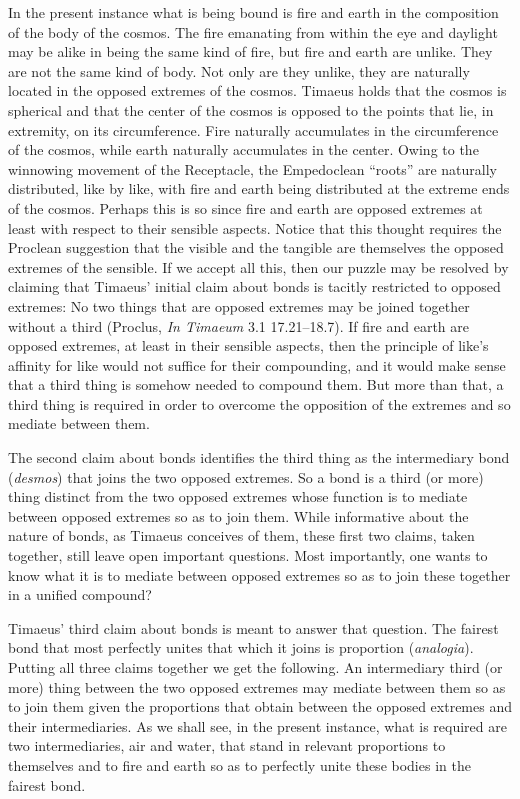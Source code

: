 In the present instance what is being bound is fire and earth in the composition of the body of the cosmos. The fire emanating from within the eye and daylight may be alike in being the same kind of fire, but fire and earth are unlike. They are not the same kind of body. Not only are they unlike, they are naturally located in the opposed extremes of the cosmos. Timaeus holds that the cosmos is spherical and that the center of the cosmos is opposed to the points that lie, in extremity, on its circumference. Fire naturally accumulates in the circumference of the cosmos, while earth naturally accumulates in the center. Owing to the winnowing movement of the Receptacle, the Empedoclean ``roots'' are naturally distributed, like by like, with fire and earth being distributed at the extreme ends of the cosmos. Perhaps this is so since fire and earth are opposed extremes at least with respect to their sensible aspects. Notice that this thought requires the Proclean suggestion that the visible and the tangible are themselves the opposed extremes of the sensible. If we accept all this, then our puzzle may be resolved by claiming that Timaeus' initial claim about bonds is tacitly restricted to opposed extremes: No two things that are opposed extremes may be joined together without a third (Proclus, \emph{In Timaeum} 3.1 17.21--18.7). If fire and earth are opposed extremes, at least in their sensible aspects, then the principle of like's affinity for like would not suffice for their compounding, and it would make sense that a third thing is somehow needed to compound them. But more than that, a third thing is required in order to overcome the opposition of the extremes and so mediate between them.

The second claim about bonds identifies the third thing as the intermediary bond (\emph{desmos}) that joins the two opposed extremes. So a bond is a third (or more) thing distinct from the two opposed extremes whose function is to mediate between opposed extremes so as to join them. While informative about the nature of bonds, as Timaeus conceives of them, these first two claims, taken together, still leave open important questions. Most importantly, one wants to know what it is to mediate between opposed extremes so as to join these together in a unified compound? 

Timaeus' third claim about bonds is meant to answer that question. The fairest bond that most perfectly unites that which it joins is proportion (\emph{analogia}). Putting all three claims together we get the following. An intermediary third (or more) thing between the two opposed extremes may mediate between them so as to join them given the proportions that obtain between the opposed extremes and their intermediaries. As we shall see, in the present instance, what is required are two intermediaries, air and water, that stand in relevant proportions to themselves and to fire and earth so as to perfectly unite these bodies in the fairest bond.

